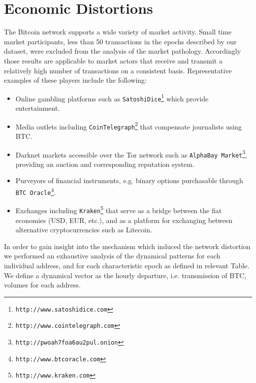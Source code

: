 


\section{Economic Distortions}


The Bitcoin network supports a wide variety of market activity.
Small time market participants, less than 50 transactions in the epochs described by our dataset, were excluded from the analysis of the market pathology. 
Accordingly those results are applicable to market actors that receive and transmit a relatively high number of transactions on a consistent basis.
Representative examples of these players include the following: 
\begin{itemize}
  \item Online gambling platforms such as \texttt{SatoshiDice}\footnote{\texttt{http://www.satoshidice.com}} which provide entertainment.
  \item Media outlets including \texttt{CoinTelegraph}\footnote{\texttt{http://www.cointelegraph.com}} that compensate journalists using BTC.  
  \item Darknet markets accessible over the Tor network such as \texttt{AlphaBay Market}\footnote{\texttt{http://pwoah7foa6au2pul.onion}}, providing an auction and corresponding reputation system. 
  \item Purveyors of financial instruments, e.g. binary options purchasable through \texttt{BTC Oracle}\footnote{\texttt{http://www.btcoracle.com}}.
  \item Exchanges including \texttt{Kraken}\footnote{\texttt{http://www.kraken.com}} that serve as a bridge between the fiat economies (USD, EUR, etc.), and as a platform for exchanging between alternative cryptocurrencies such as Litecoin. 
\end{itemize}

In order to gain insight into the mechanism which induced the network distortion we performed an exhaustive analysis of the dynamical patterns for each individual address, and for each characteristic epoch as defined in relevant Table.  
We define a dynamical vector as the hourly departure, i.e. transmission of BTC, volumes for each address.

